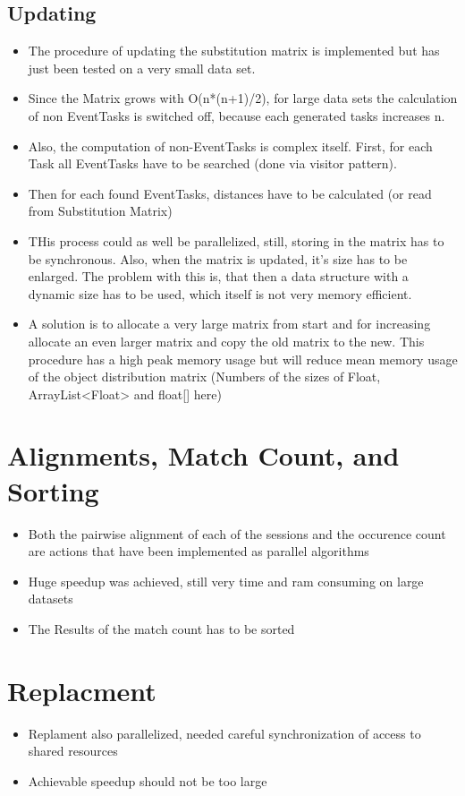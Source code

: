 \subsection{Updating}
\begin{itemize}
	\item The procedure of updating the substitution matrix is implemented but has just been tested on a very small data set. 
	\item Since the Matrix grows with O(n*(n+1)/2), for large data sets the calculation of non EventTasks is switched off, because each generated tasks increases n.
	\item Also, the computation of non-EventTasks is complex itself. First, for each Task all EventTasks have to be searched (done via visitor pattern). 
	\item Then for each found EventTasks, distances have to be calculated (or read from Substitution Matrix)
	\item THis process could as well be parallelized, still, storing in the matrix has to be synchronous. Also, when the matrix is updated, it's size has to be enlarged. The problem with this is, that then a data structure with a dynamic size has to be used, which itself is not very memory efficient. 
	\item A solution is to allocate a very large matrix from start and for increasing allocate an even larger matrix and copy the old matrix to the new. This procedure has a high peak memory usage but will reduce mean memory usage of the object distribution matrix (Numbers of the sizes of Float, ArrayList<Float> and float[] here)
\end{itemize}

\section{Alignments, Match Count, and Sorting}
\begin{itemize}
	\item Both the pairwise alignment of each of the sessions and the occurence count are actions that have been implemented as parallel algorithms
	\item Huge speedup was achieved, still very time and ram consuming on large datasets
	\item The Results of the match count has to be sorted
\end{itemize}

\section{Replacment}
\begin{itemize}
	\item Replament also parallelized, needed careful synchronization of access to shared resources
	\item Achievable speedup should not be too large
\end{itemize}

